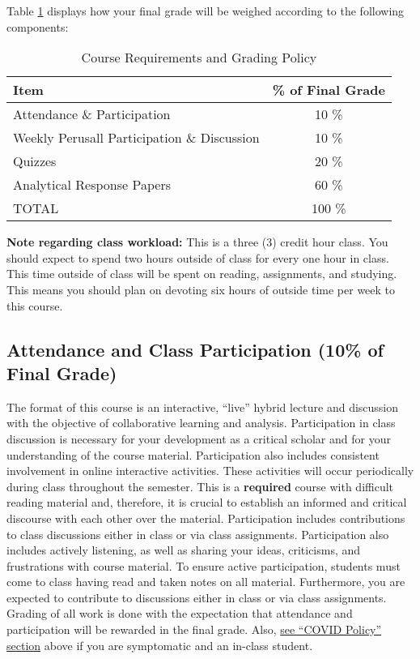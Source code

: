 \documentclass[11pt,]{article}
\begin{document}
Table \ref{tab:weight_table} displays how your final grade will be
weighed according to the following components:

\renewcommand{\arraystretch}{1.5}

\begin{table}[!h]

\caption{\label{tab:weight_table}Course Requirements and Grading Policy}
\centering
\fontsize{10}{12}\selectfont
\begin{tabular}[t]{lc}
\toprule
\textbf{Item} & \textbf{\% of Final Grade}\\
\midrule
Attendance \& Participation & 10 \%\\
Weekly Perusall Participation \& Discussion & 10 \%\\
Quizzes & 20 \%\\
Analytical Response Papers & 60 \%\\
TOTAL & 100 \%\\
\bottomrule
\end{tabular}
\end{table}

\textbf{Note regarding class workload:} This is a three (3) credit hour
class. You should expect to spend two hours outside of class for every
one hour in class. This time outside of class will be spent on reading,
assignments, and studying. This means you should plan on devoting six
hours of outside time per week to this course.

\hypertarget{attendance-and-class-participation-10-of-final-grade}{%
\subsection{Attendance and Class Participation (10\% of Final
Grade)}\label{attendance-and-class-participation-10-of-final-grade}}

The format of this course is an interactive, ``live'' hybrid lecture and
discussion with the objective of collaborative learning and analysis.
Participation in class discussion is necessary for your development as a
critical scholar and for your understanding of the course material.
Participation also includes consistent involvement in online interactive
activities. These activities will occur periodically during class
throughout the semester. This is a \textbf{required} course with
difficult reading material and, therefore, it is crucial to establish an
informed and critical discourse with each other over the material.
Participation includes contributions to class discussions either in
class or via class assignments. Participation also includes actively
listening, as well as sharing your ideas, criticisms, and frustrations
with course material. To ensure active participation, students must come
to class having read and taken notes on all material. Furthermore, you
are expected to contribute to discussions either in class or via class
assignments. Grading of all work is done with the expectation that
attendance and participation will be rewarded in the final grade. Also,
\protect\hyperlink{covid_policy}{see ``COVID Policy'' section} above if
you are symptomatic and an in-class student.
\end{document}
